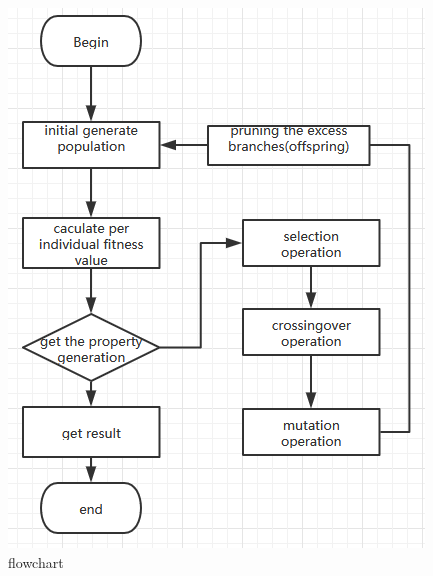 \documentclass[12pt]{article}
\begin{document}
\begin{figure}[h]
	\centering
	\includegraphics{flowchart1}
	\caption{flowchart}
\end{figure}
	\small
	
	

%
%
\end{document}
